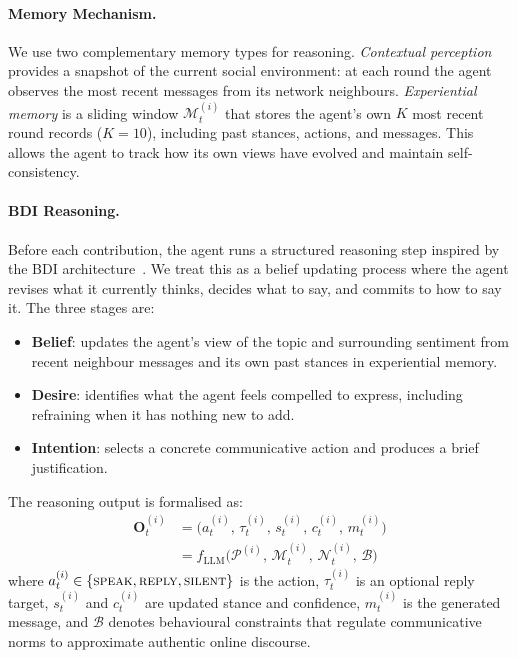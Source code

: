 \paragraph{Memory Mechanism.}
We use two complementary memory types for reasoning. \emph{Contextual perception} provides a snapshot of the current social environment: at each round the agent observes the most recent messages from its network neighbours. \emph{Experiential memory} is a sliding window $\mathcal{M}_t^{(i)}$ that stores the agent's own $K$ most recent round records ($K{=}10$), including past stances, actions, and messages. This allows the agent to track how its own views have evolved and maintain self-consistency.

\paragraph{BDI Reasoning.}
Before each contribution, the agent runs a structured reasoning step inspired by the BDI architecture~\citep{Bratman1987, Rao1995}. We treat this as a belief updating process where the agent revises what it currently thinks, decides what to say, and commits to how to say it. The three stages are:
\begin{itemize}
\setlength{\itemsep}{1pt}
\item \textbf{Belief}: updates the agent's view of the topic and surrounding sentiment from recent neighbour messages and its own past stances in experiential memory.
\item \textbf{Desire}: identifies what the agent feels compelled to express, including refraining when it has nothing new to add.
\item \textbf{Intention}: selects a concrete communicative action and produces a brief justification.
\end{itemize}
The reasoning output is formalised as:
\begin{equation}
\begin{aligned}
  \mathbf{O}_t^{(i)} &= \bigl(a_t^{(i)},\, \tau_t^{(i)},\, s_t^{(i)},\, c_t^{(i)},\, m_t^{(i)}\bigr) \\
  &= f_{\text{LLM}}\bigl(\mathcal{P}^{(i)},\, \mathcal{M}_t^{(i)},\, \mathcal{N}_t^{(i)},\, \mathcal{B}\bigr)
\end{aligned}
\label{eq:bdi_output}
\end{equation}
where $a_t^{(i)} \in \{\textsc{speak}, \textsc{reply}, \textsc{silent}\}$ is the action, $\tau_t^{(i)}$ is an optional reply target, $s_t^{(i)}$ and $c_t^{(i)}$ are updated stance and confidence, $m_t^{(i)}$ is the generated message, and $\mathcal{B}$ denotes behavioural constraints that regulate communicative norms to approximate authentic online discourse.


